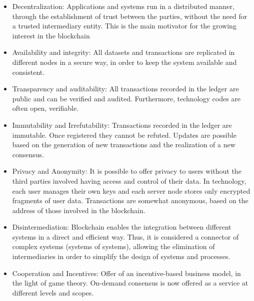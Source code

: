 \begin{itemize}
\item Decentralization: Applications and systems run in a distributed manner, through the establishment of trust between the parties, without the need for a trusted intermediary entity. This is the main motivator for the growing interest in the blockchain
\item Availability and integrity: All datasets and transactions are replicated in different nodes in a secure way, in order to keep the system available and consistent.
\item Transparency and auditability: All transactions recorded in the ledger are public and can be verified and audited. Furthermore, technology codes are often open, verifiable.
\item Immutability and Irrefutability: Transactions recorded in the ledger are immutable. Once registered they cannot be refuted. Updates are possible based on the generation of new transactions and the realization of a new consensus.
\item Privacy and Anonymity: It is possible to offer privacy to users without the third parties involved having access and control of their data. In technology, each user manages their own keys and each server node stores only encrypted fragments of user data. Transactions are somewhat anonymous, based on the address of those involved in the blockchain.
\item Disintermediation: Blockchain enables the integration between different systems in a direct and efficient way. Thus, it is considered a connector of complex systems (systems of systems), allowing the elimination of intermediaries in order to simplify the design of systems and processes.
\item Cooperation and Incentives: Offer of an incentive-based business model, in the light of game theory. On-demand consensus is now offered as a service at different levels and scopes.
\end{itemize}

